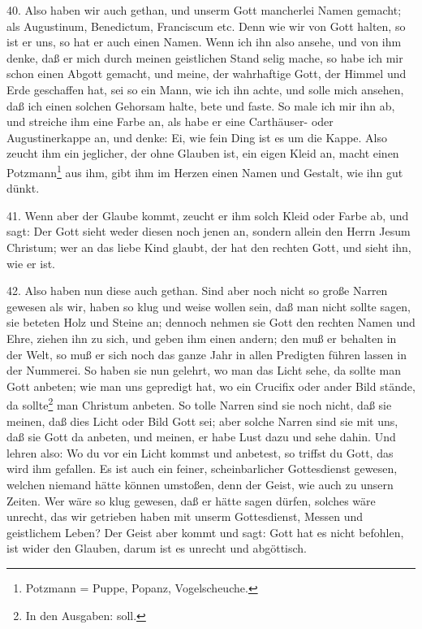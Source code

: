 40. Also haben wir auch gethan, und unserm Gott mancherlei Namen gemacht; als Augustinum, Benedictum, Franciscum etc. Denn wie wir von Gott halten, so ist er uns, so hat er auch einen Namen. Wenn ich ihn also ansehe, und von ihm denke, daß er mich durch meinen geistlichen Stand selig mache, so habe ich mir schon einen Abgott gemacht, und meine, der wahrhaftige Gott, der Himmel und Erde geschaffen hat, sei so ein Mann, wie ich ihn achte, und solle mich ansehen, daß ich einen solchen Gehorsam halte, bete und faste. So male ich mir ihn ab, und streiche ihm eine Farbe an, als habe er eine Carthäuser- oder Augustinerkappe an, und denke: Ei, wie fein Ding ist es um die Kappe. Also zeucht ihm ein jeglicher, der ohne Glauben ist, ein eigen Kleid an, macht einen Potzmann\footnote{Potzmann = Puppe, Popanz, Vogelscheuche.} aus ihm, gibt ihm im Herzen einen Namen und Gestalt, wie ihn gut dünkt.

41. Wenn aber der Glaube kommt, zeucht er ihm solch Kleid oder Farbe ab, und sagt: Der Gott sieht weder diesen noch jenen an, sondern allein den Herrn Jesum Christum; wer an das liebe Kind glaubt, der hat den rechten Gott, und sieht ihn, wie er ist.

42. Also haben nun diese auch gethan. Sind aber noch nicht so große Narren gewesen als wir, haben so klug und weise wollen sein, daß man nicht sollte sagen, sie beteten Holz und Steine an; dennoch nehmen sie Gott den rechten Namen und Ehre, ziehen ihn zu sich, und geben ihm einen andern; den muß er behalten in der Welt, so muß er sich noch das ganze Jahr in allen Predigten führen lassen in der Nummerei. So haben sie nun gelehrt, wo man das Licht sehe, da sollte man Gott anbeten; wie man uns gepredigt hat, wo ein Crucifix oder ander Bild stände, da sollte\footnote{In den Ausgaben: soll.} man Christum anbeten. So tolle Narren sind sie noch nicht, daß sie meinen, daß dies Licht oder Bild Gott sei; aber solche Narren sind sie mit uns, daß sie Gott da anbeten, und meinen, er habe Lust dazu und sehe dahin. Und lehren also: Wo du vor ein Licht kommst und anbetest, so triffst du Gott, das wird ihm gefallen. Es ist auch ein feiner, scheinbarlicher Gottesdienst gewesen, welchen niemand hätte können umstoßen, denn der Geist, wie auch zu unsern Zeiten. Wer wäre so klug gewesen, daß er hätte sagen dürfen, solches wäre unrecht, das wir getrieben haben mit unserm Gottesdienst, Messen und geistlichem Leben? Der Geist aber kommt und sagt: Gott hat es nicht befohlen, ist wider den Glauben, darum ist es unrecht und abgöttisch.

